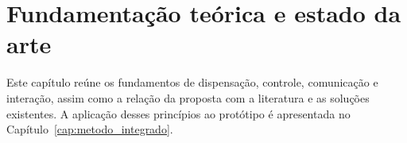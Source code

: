 \chapter{Fundamentação teórica e estado da arte}\label{cap:base_teorica}
Este capítulo reúne os fundamentos de dispensação, controle, comunicação e interação,
assim como a relação da proposta com a literatura e as soluções existentes.
A aplicação desses princípios ao protótipo é apresentada no Capítulo~\ref{cap:metodo_integrado}.

